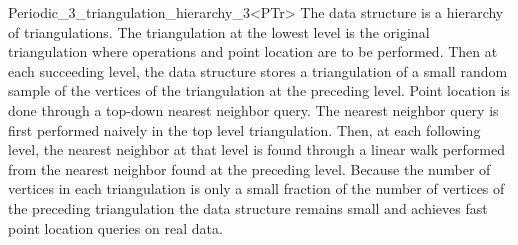 \begin{ccRefClass}{Periodic_3_triangulation_hierarchy_3<PTr>}
\ccImplementation
The data structure is a hierarchy of triangulations. The triangulation
at the lowest level is the original triangulation where operations and
point location are to be performed.
Then at each succeeding level, the data structure
stores a triangulation of a small random sample of the vertices
of the triangulation at the preceding level. Point location
is done through a top-down nearest neighbor query.
The nearest neighbor query is first
performed naively in the top level triangulation.
Then, at each following level, the nearest neighbor at that level
is found through a linear walk performed from
the nearest neighbor found at the preceding level.
Because the number of vertices in each triangulation is only a small
fraction of the number of vertices of the preceding triangulation 
the data structure remains small and achieves fast point location 
queries on real data.

\ccSeeAlso
{}\\

\end{ccRefClass}
